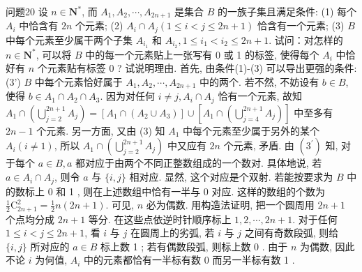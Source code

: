 问题20 设 $n \in \mathbf{N}^*$, 而 $A_1, A_2, \cdots, A_{2 n+1}$ 是集合 $B$ 的一族子集且满足条件:
(1) 每个 $A_i$ 中恰含有 $2 n$ 个元素;
(2) $A_i \cap A_j(1 \leqslant i<j \leqslant 2 n+1)$ 恰含有一个元素;
(3) $B$ 中每个元素至少属干两个子集 $A_{i_1}$ 和 $A_{i_2}, 1 \leqslant i_1<i_2 \leqslant 2 n+1$.
试问：对怎样的 $n \in \mathbf{N}^*$, 可以将 $B$ 中的每一个元素贴上一张写有 0 或 1 的标签, 使得每个 $A_i$ 中恰好有 $n$ 个元素贴有标签 0 ? 试说明理由.
首先, 由条件(1)-(3) 可以导出更强的条件: (3') $B$ 中每个元素恰好属于 $A_1, A_2, \cdots, A_{2 n+1}$ 中的两个.
若不然, 不妨设有 $b \in B$, 使得 $b \in A_1 \cap A_2 \cap A_3$. 因为对任何 $i \neq j, A_i \cap A_j$ 恰有一个元素, 故知 $A_1 \cap\left(\bigcup_{j=2}^{2 n+1} A_j\right)= \left[A_1 \cap\left(A_2 \cup A_3\right)\right] \cup\left[A_1 \cap\left(\bigcup_{j=4}^{2 n+1} A_j\right)\right]$ 中至多有 $2 n-1$ 个元素.
另一方面, 又由 (3) 知 $A_1$ 中每个元素至少属于另外的某个 $A_i(i \neq 1)$, 所以 $A_1 \cap\left(\bigcup_{j=2}^{2 n+1} A_j\right)$ 中又应有 $2 n$ 个元素, 矛盾.
由 $\left(3^{\prime}\right)$ 知, 对于每个 $a \in B, a$ 都对应于由两个不同正整数组成的一个数对.
具体地说, 若 $a \in A_i \cap A_j$, 则令 $a$ 与 $\{i, j\}$ 相对应.
显然, 这个对应是个双射.
若能按要求为 $B$ 中的数标上 0 和 1 , 则在上述数组中恰有一半与 0 对应.
这样的数组的个数为 $\frac{1}{2} \mathrm{C}_{2 n+1}^2=\frac{1}{2} n(2 n+1)$. 可见, $n$ 必为偶数.
用构造法证明, 把一个圆周用 $2 n+1$ 个点均分成 $2 n+1$ 等分.
在这些点依逆时针顺序标上 $1,2, \cdots, 2 n+1$. 对于任何 $1 \leqslant i<j \leqslant 2 n+1$, 看 $i$ 与 $j$ 在圆周上的劣弧, 若 $i$ 与 $j$ 之间有奇数段弧, 则给 $\{i, j\}$ 所对应的 $a \in B$ 标上数 1 ; 若有偶数段弧, 则标上数 0 . 由于 $n$ 为偶数, 因此不论 $i$ 为何值, $A_i$ 中的元素都恰有一半标有数 0 而另一半标有数 1 .


